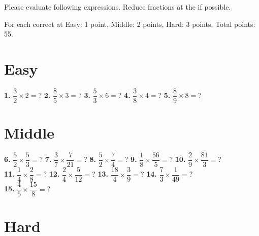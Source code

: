 \documentclass[a4paper]{article}
\begin{document}
\begin{Large}

Please evaluate following expressions. Reduce fractions at the if possible.

For each correct at Easy: 1 point, Middle: 2 points, Hard: 3 points. Total points: 55.

\section* {Easy}
		
\textbf{1.} $\dfrac{3}{2} \times 2 =$? \hspace{0.2cm}
\textbf{2.} $\dfrac{8}{5} \times 3 =$? \hspace{0.2cm}
\textbf{3.} $\dfrac{5}{3} \times 6 =$? \hspace{0.2cm}
\textbf{4.} $\dfrac{3}{8} \times 4 =$? \hspace{0.2cm}
\textbf{5.} $\dfrac{8}{9} \times 8 =$?

		
\section* {Middle}
		
\textbf{6.} $\dfrac{5}{2} \times \dfrac{5}{3} =$? \hspace{0.2cm}
\textbf{7.} $\dfrac{3}{7} \times \dfrac{7}{21} =$? \hspace{0.2cm}
\textbf{8.} $\dfrac{5}{2} \times \dfrac{7}{4} =$? \hspace{0.2cm}
\textbf{9.} $\dfrac{1}{8} \times \dfrac{56}{5} =$? \hspace{0.2cm}
\textbf{10.} $\dfrac{2}{9} \times \dfrac{81}{3} =$? \\[0.75cm]
\textbf{11.} $\dfrac{1}{4} \times \dfrac{2}{8}=$? \hspace{0.2cm}
\textbf{12.} $\dfrac{2}{4} \times \dfrac{5}{12} =$? \hspace{0.2cm}
\textbf{13.} $\dfrac{18}{4} \times \dfrac{3}{9} =$? \hspace{0.2cm}
\textbf{14.} $\dfrac{7}{3} \times \dfrac{1}{49} =$? \\[0.75cm]
\textbf{15.} $\dfrac{4}{5} \times \dfrac{15}{8} =$?
		
\section* {Hard}


\end{Large}
\end{document}
